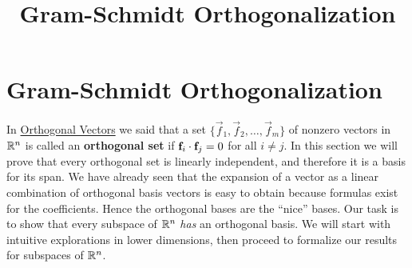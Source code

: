 \documentclass{ximera}
\title{Gram-Schmidt Orthogonalization} \license{CC BY-NC-SA 4.0}
\begin{document}
\begin{abstract}

\end{abstract}
\maketitle

\section*{Gram-Schmidt Orthogonalization}
In \href{https://ximera.osu.edu/oerlinalg/LinearAlgebra/RTH-0010/main}{Orthogonal Vectors} we said that a set $\{ \vec{f}_1, \vec{f}_2, \dots, \vec{f}_m\}$ of nonzero vectors in $\mathbb{R}^n$ is called an \textbf{orthogonal set} if $\mathbf{f}_i \cdot \mathbf{f}_j =0$ for all $i \neq j$.  In this section we will prove that every orthogonal set is linearly independent, and therefore it is a basis for its span.  We have already seen that the expansion of a vector as a linear combination of orthogonal basis vectors is easy to obtain because formulas exist for the coefficients.  Hence the orthogonal bases are the ``nice'' bases. %
Our task is to show that every subspace of $\mathbb{R}^n$ \textit{has} an orthogonal basis.  We will start with intuitive explorations in lower dimensions, then proceed to formalize our results for subspaces of $\mathbb{R}^n$.
\end{document}
